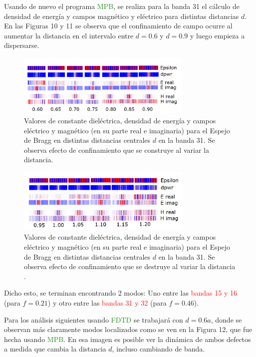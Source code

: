 \documentclass{book}
\begin{document}
Usando de nuevo el programa \textcolor{ForestGreen}{MPB}, se realiza para la banda 31 el cálculo de densidad de energía y campos magnético y eléctrico para distintas distancias $d$. En las Figuras 10 y 11 se observa que el confinamiento de campo ocurre al aumentar la distancia en el intervalo entre $d=0.6$ y $d=0.9$ y luego empieza a dispersarse.
\begin{figure}[ht]
 \centering
   \includegraphics[width=0.75\textwidth]{defecto1.png}
   \caption{Valores de constante dieléctrica, densidad de energía y campos eléctrico y magnético (en su parte real e imaginaria) para el Espejo de Bragg en distintas distancias centrales $d$ en la banda 31. Se observa efecto de confinamiento que se construye al variar la distancia. }
 \end{figure}
 \begin{figure}[ht]
 \centering
   \includegraphics[width=0.75\textwidth]{defecto2.png}
   \caption{Valores de constante dieléctrica, densidad de energía y campos eléctrico y magnético (en su parte real e imaginaria) para el Espejo de Bragg en distintas distancias centrales $d $ en la banda 31. Se observa efecto de confinamiento que se destruye al variar la distancia .}
 \end{figure}
 
 Dicho esto, se terminan encontrando 2 modos: Uno entre las \textcolor{red}{bandas 15 y 16} (para $f=0.21$) y otro entre las \textcolor{red}{bandas 31 y 32} (para $f=0.46$). 
 
 Para los análisis siguientes usando \textcolor{ForestGreen}{FDTD} se trabajará con $d=0.6 a$, donde se observan más claramente modos localizados como se ven en la Figura 12, que fue hecha usando \textcolor{ForestGreen}{MPB}. En esa imagen es posible ver la dinámica de ambos defectos a medida que cambia la distancia $d$, incluso cambiando de banda.
 
\end{document}
